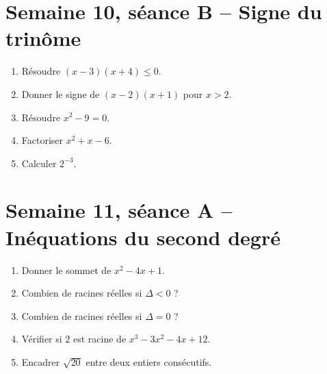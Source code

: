 \section{Semaine 10, séance B -- Signe du trinôme}
\begin{enumerate}
  \item Résoudre $(x-3)(x+4)\leq0$.
  \item Donner le signe de $(x-2)(x+1)$ pour $x>2$.
  \item Résoudre $x^2-9=0$.
  \item Factoriser $x^2+x-6$.
  \item Calculer $2^{-3}$.
\end{enumerate}

\section{Semaine 11, séance A -- Inéquations du second degré}
\begin{enumerate}
  \item Donner le sommet de $x^2-4x+1$.
  \item Combien de racines réelles si $\Delta<0$ ?
  \item Combien de racines réelles si $\Delta=0$ ?
  \item Vérifier si $2$ est racine de $x^3-3x^2-4x+12$.
  \item Encadrer $\sqrt{20}$ entre deux entiers consécutifs.
\end{enumerate}

